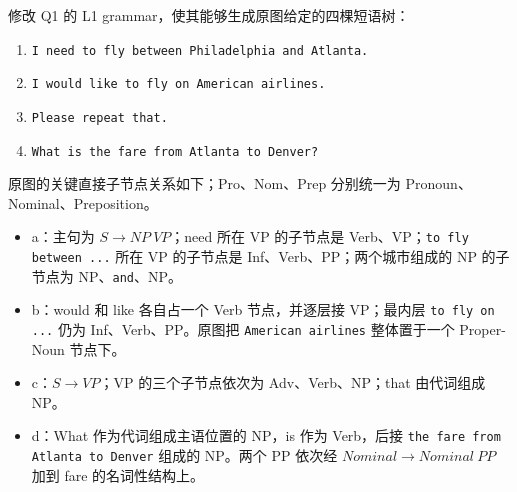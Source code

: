 修改 Q1 的 L1 grammar，使其能够生成原图给定的四棵短语树：
\begin{enumerate}[label=\alph*)]
  \item \texttt{I need to fly between Philadelphia and Atlanta.}
  \item \texttt{I would like to fly on American airlines.}
  \item \texttt{Please repeat that.}
  \item \texttt{What is the fare from Atlanta to Denver?}
\end{enumerate}
原图的关键直接子节点关系如下；Pro、Nom、Prep 分别统一为 Pronoun、Nominal、Preposition。
\begin{itemize}
  \item a：主句为 $S\rightarrow NP\ VP$；need 所在 VP 的子节点是 Verb、VP；\texttt{to fly between ...} 所在 VP 的子节点是 Inf、Verb、PP；两个城市组成的 NP 的子节点为 NP、\texttt{and}、NP。
  \item b：would 和 like 各自占一个 Verb 节点，并逐层接 VP；最内层 \texttt{to fly on ...} 仍为 Inf、Verb、PP。原图把 \texttt{American airlines} 整体置于一个 Proper-Noun 节点下。
  \item c：$S\rightarrow VP$；VP 的三个子节点依次为 Adv、Verb、NP；that 由代词组成 NP。
  \item d：What 作为代词组成主语位置的 NP，is 作为 Verb，后接 \texttt{the fare from Atlanta to Denver} 组成的 NP。两个 PP 依次经 $Nominal\rightarrow Nominal\ PP$ 加到 fare 的名词性结构上。
\end{itemize}

